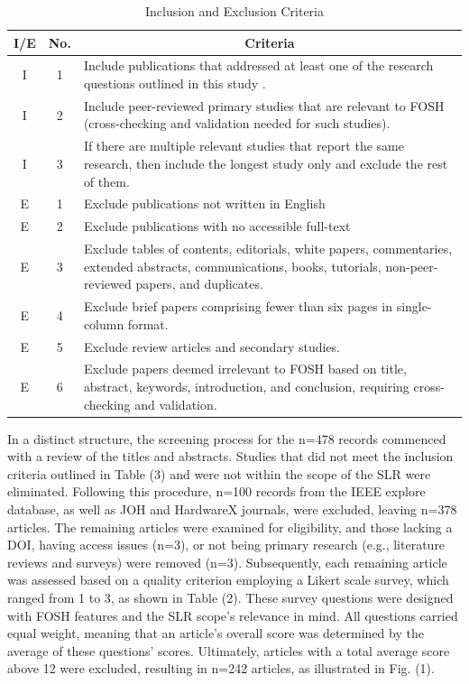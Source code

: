 \documentclass[final-report.tex]{subfiles}
\begin{document}
\begin{table}[htbp]
\centering
\caption{Inclusion and Exclusion Criteria}
\begin{tabular}{|c|c|p{6.5cm}|}
\hline
\textbf{I/E} & \textbf{No.} & \multicolumn{1}{c|}{\textbf{Criteria}} \\
\hline
I & 1 & Include publications that addressed at least one of the research questions outlined in this study . \\
\hline
I & 2 & Include peer-reviewed primary studies that are relevant to FOSH (cross-checking and validation needed for such studies). \\
\hline
I & 3 & If there are multiple relevant studies that report the same research, then include the longest study only and exclude the rest of them. \\
\hline
E & 1 & Exclude publications not written in English \\
\hline
E & 2 & Exclude publications with no accessible full-text\\
\hline
E & 3 & Exclude tables of contents, editorials, white papers, commentaries, extended abstracts, communications, books, tutorials, non-peer-reviewed papers, and duplicates. \\
\hline
E & 4 & Exclude brief papers comprising fewer than six pages in single-column format. \\
\hline
E & 5 & Exclude review articles and secondary studies. \\
\hline
E & 6 & Exclude papers deemed irrelevant to FOSH based on title, abstract, keywords, introduction, and conclusion, requiring cross-checking and validation. \\
\hline
\end{tabular}
\label{tab:criteria}
\end{table}

In a distinct structure, the screening process for the n=478 records commenced with a review of the titles and abstracts. 
Studies that did not meet the inclusion criteria outlined in Table (3) and were not within the scope of the SLR were eliminated. 
Following this procedure, n=100 records from the IEEE explore database, as well as JOH and HardwareX journals, were excluded, leaving n=378 articles. 
The remaining articles were examined for eligibility, and those lacking a DOI, having access issues (n=3), or not being primary research (e.g., literature reviews and surveys) were removed (n=3). 
Subsequently, each remaining article was assessed based on a quality criterion employing a Likert scale survey, which ranged from 1 to 3, as shown in Table (2). 
These survey questions were designed with FOSH features and the SLR scope's relevance in mind. 
All questions carried equal weight, meaning that an article's overall score was determined by the average of these questions' scores. 
Ultimately, articles with a total average score above 12 were excluded, resulting in n=242 articles, as illustrated in Fig. (1).
\end{document}
